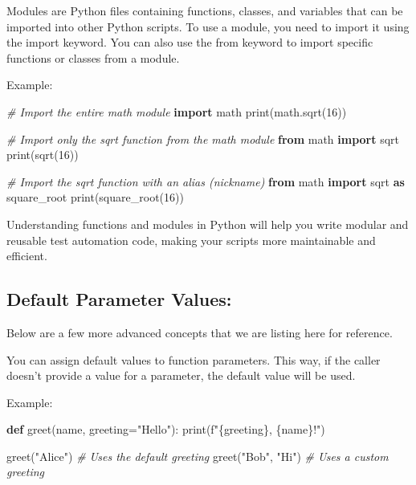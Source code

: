 \documentclass[
  paper=a4,
  ,captions=tableheading
]{scrartcl}
\newenvironment{Shaded}{}{}
\newcommand{\BuiltInTok}[1]{\textcolor[rgb]{0.00,0.50,0.00}{#1}}
\newcommand{\CommentTok}[1]{\textcolor[rgb]{0.38,0.63,0.69}{\textit{#1}}}
\newcommand{\DecValTok}[1]{\textcolor[rgb]{0.25,0.63,0.44}{#1}}
\newcommand{\ImportTok}[1]{\textcolor[rgb]{0.00,0.50,0.00}{\textbf{#1}}}
\newcommand{\KeywordTok}[1]{\textcolor[rgb]{0.00,0.44,0.13}{\textbf{#1}}}
\newcommand{\NormalTok}[1]{#1}
\newcommand{\OperatorTok}[1]{\textcolor[rgb]{0.40,0.40,0.40}{#1}}
\newcommand{\SpecialCharTok}[1]{\textcolor[rgb]{0.25,0.44,0.63}{#1}}
\newcommand{\SpecialStringTok}[1]{\textcolor[rgb]{0.73,0.40,0.53}{#1}}
\newcommand{\StringTok}[1]{\textcolor[rgb]{0.25,0.44,0.63}{#1}}
\begin{document}
Modules are Python files containing functions, classes, and variables
that can be imported into other Python scripts. To use a module, you
need to import it using the import keyword. You can also use the from
keyword to import specific functions or classes from a module.

Example:

\begin{Shaded}
\begin{Highlighting}[]
\CommentTok{\# Import the entire math module}
\ImportTok{import}\NormalTok{ math}
\BuiltInTok{print}\NormalTok{(math.sqrt(}\DecValTok{16}\NormalTok{))}

\CommentTok{\# Import only the sqrt function from the math module}
\ImportTok{from}\NormalTok{ math }\ImportTok{import}\NormalTok{ sqrt}
\BuiltInTok{print}\NormalTok{(sqrt(}\DecValTok{16}\NormalTok{))}

\CommentTok{\# Import the sqrt function with an alias (nickname)}
\ImportTok{from}\NormalTok{ math }\ImportTok{import}\NormalTok{ sqrt }\ImportTok{as}\NormalTok{ square\_root}
\BuiltInTok{print}\NormalTok{(square\_root(}\DecValTok{16}\NormalTok{))}
\end{Highlighting}
\end{Shaded}

Understanding functions and modules in Python will help you write
modular and reusable test automation code, making your scripts more
maintainable and efficient.

\hypertarget{default-parameter-values}{%
\subsection{Default Parameter Values:}\label{default-parameter-values}}

Below are a few more advanced concepts that we are listing here for
reference.

You can assign default values to function parameters. This way, if the
caller doesn't provide a value for a parameter, the default value will
be used.

Example:

\begin{Shaded}
\begin{Highlighting}[]
\KeywordTok{def}\NormalTok{ greet(name, greeting}\OperatorTok{=}\StringTok{"Hello"}\NormalTok{):}
    \BuiltInTok{print}\NormalTok{(}\SpecialStringTok{f"}\SpecialCharTok{\{}\NormalTok{greeting}\SpecialCharTok{\}}\SpecialStringTok{, }\SpecialCharTok{\{}\NormalTok{name}\SpecialCharTok{\}}\SpecialStringTok{!"}\NormalTok{)}

\NormalTok{greet(}\StringTok{"Alice"}\NormalTok{)  }\CommentTok{\# Uses the default greeting}
\NormalTok{greet(}\StringTok{"Bob"}\NormalTok{, }\StringTok{"Hi"}\NormalTok{)  }\CommentTok{\# Uses a custom greeting}
\end{Highlighting}
\end{Shaded}
\end{document}
